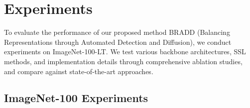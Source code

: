 \section{Experiments}
\label{experiments}









%
%

\noindent
To evaluate the performance of our proposed method BRADD (Balancing Representations through Automated Detection and Diffusion), we conduct experiments on ImageNet-100-LT. We test various backbone architectures, SSL methods, and implementation details through comprehensive ablation studies, and compare against state-of-the-art approaches.

\subsection{ImageNet-100 Experiments}

